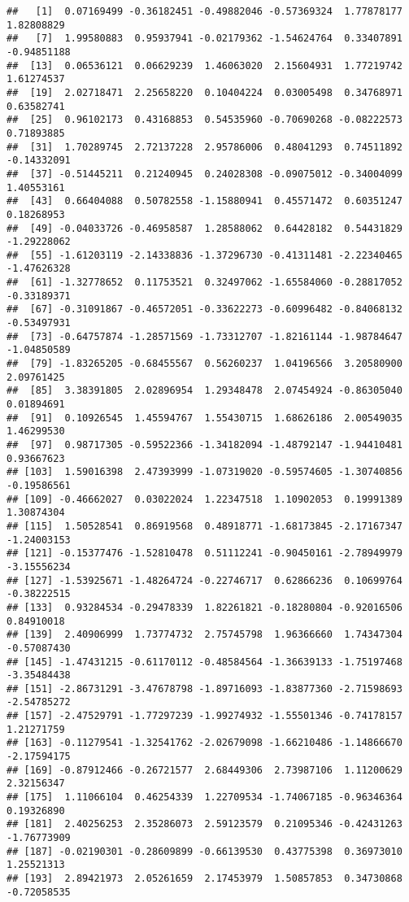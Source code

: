\documentclass[
]{article}
\begin{document}
\begin{verbatim}
##   [1]  0.07169499 -0.36182451 -0.49882046 -0.57369324  1.77878177  1.82808829
##   [7]  1.99580883  0.95937941 -0.02179362 -1.54624764  0.33407891 -0.94851188
##  [13]  0.06536121  0.06629239  1.46063020  2.15604931  1.77219742  1.61274537
##  [19]  2.02718471  2.25658220  0.10404224  0.03005498  0.34768971  0.63582741
##  [25]  0.96102173  0.43168853  0.54535960 -0.70690268 -0.08222573  0.71893885
##  [31]  1.70289745  2.72137228  2.95786006  0.48041293  0.74511892 -0.14332091
##  [37] -0.51445211  0.21240945  0.24028308 -0.09075012 -0.34004099  1.40553161
##  [43]  0.66404088  0.50782558 -1.15880941  0.45571472  0.60351247  0.18268953
##  [49] -0.04033726 -0.46958587  1.28588062  0.64428182  0.54431829 -1.29228062
##  [55] -1.61203119 -2.14338836 -1.37296730 -0.41311481 -2.22340465 -1.47626328
##  [61] -1.32778652  0.11753521  0.32497062 -1.65584060 -0.28817052 -0.33189371
##  [67] -0.31091867 -0.46572051 -0.33622273 -0.60996482 -0.84068132 -0.53497931
##  [73] -0.64757874 -1.28571569 -1.73312707 -1.82161144 -1.98784647 -1.04850589
##  [79] -1.83265205 -0.68455567  0.56260237  1.04196566  3.20580900  2.09761425
##  [85]  3.38391805  2.02896954  1.29348478  2.07454924 -0.86305040  0.01894691
##  [91]  0.10926545  1.45594767  1.55430715  1.68626186  2.00549035  1.46299530
##  [97]  0.98717305 -0.59522366 -1.34182094 -1.48792147 -1.94410481  0.93667623
## [103]  1.59016398  2.47393999 -1.07319020 -0.59574605 -1.30740856 -0.19586561
## [109] -0.46662027  0.03022024  1.22347518  1.10902053  0.19991389  1.30874304
## [115]  1.50528541  0.86919568  0.48918771 -1.68173845 -2.17167347 -1.24003153
## [121] -0.15377476 -1.52810478  0.51112241 -0.90450161 -2.78949979 -3.15556234
## [127] -1.53925671 -1.48264724 -0.22746717  0.62866236  0.10699764 -0.38222515
## [133]  0.93284534 -0.29478339  1.82261821 -0.18280804 -0.92016506  0.84910018
## [139]  2.40906999  1.73774732  2.75745798  1.96366660  1.74347304 -0.57087430
## [145] -1.47431215 -0.61170112 -0.48584564 -1.36639133 -1.75197468 -3.35484438
## [151] -2.86731291 -3.47678798 -1.89716093 -1.83877360 -2.71598693 -2.54785272
## [157] -2.47529791 -1.77297239 -1.99274932 -1.55501346 -0.74178157  1.21271759
## [163] -0.11279541 -1.32541762 -2.02679098 -1.66210486 -1.14866670 -2.17594175
## [169] -0.87912466 -0.26721577  2.68449306  2.73987106  1.11200629  2.32156347
## [175]  1.11066104  0.46254339  1.22709534 -1.74067185 -0.96346364  0.19326890
## [181]  2.40256253  2.35286073  2.59123579  0.21095346 -0.42431263 -1.76773909
## [187] -0.02190301 -0.28609899 -0.66139530  0.43775398  0.36973010  1.25521313
## [193]  2.89421973  2.05261659  2.17453979  1.50857853  0.34730868 -0.72058535
\end{verbatim}
\end{document}
